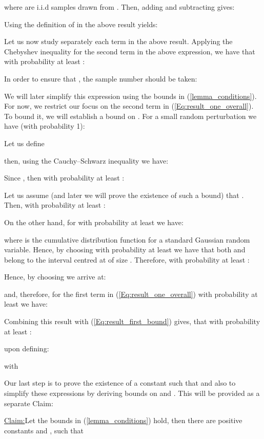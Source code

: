 \documentclass[jair,twoside,11pt,theapa]{article}
\theoremstyle{definition}
\newenvironment{claim}[1]{\par\noindent\underline{Claim:}\space#1}{}
\begin{document}
where  are i.i.d samples drawn from . Then, adding and subtracting  gives:

Using the definition of  in the above result yields:

Let us now study separately each term in the above result. Applying the Chebyshev inequality for the second term in the above expression, we have that with probability at least :

In order to ensure that , the sample number  should be taken:

We will later simplify this expression using the bounds in (\ref{lemma_conditions}). For now, we restrict our focus on the second term in (\ref{Eq:result_one_overall}). To bound it, we will establish a bound on . For a small random perturbation  we have (with probability 1):

Let us define 

then, using the Cauchy–Schwarz inequality we have:

Since , then with probability at least :

Let us assume (and later we will prove the existence of such a bound) that . Then, with probability at least :

On the other hand, for  with probability at least  we have:

where  is the cumulative distribution function for a standard Gaussian random variable. Hence, by choosing  
with probability at least  we have that both  and  belong to the interval centred at  of size . Therefore, with probability at least :

Hence, by choosing  we arrive at:

and, therefore, for the first term in (\ref{Eq:result_one_overall}) with probability at least  we have:

Combining this result with (\ref{Eq:result_first_bound}) gives, that with probability at least :

upon defining:

with

Our last step is to prove the existence of a constant  such that  and also to simplify these expressions by deriving bounds on   and . This will be provided as a separate Claim: \\

\begin{claim}
Let the bounds in (\ref{lemma_conditions}) hold, then there are positive constants  and , such that

\end{claim}
\end{document}

